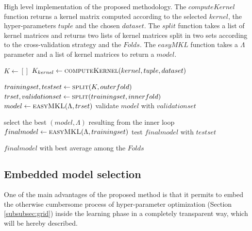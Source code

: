 \begin{algorithm}
    \caption{
        High level implementation of the proposed methodology.
        The $computeKernel$ function returns a kernel matrix computed
        according to the selected $kernel$, the hyper-parameters $tuple$ and 
        the chosen $dataset$.
        The $split$ function takes a list of kernel matrices and returns two lists
        of kernel matrices split in two sets according to the cross-validation
        strategy and the $Folds$.
        The $easyMKL$ function takes a $\Lambda$ parameter and a list of kernel
        matrices to return a $model$.
    }
    \label{alg:method}
    \begin{algorithmic}[1]
        \State $K \gets []$
        \label{line:kernels}
                \State $K_{kernel} \gets \Call{computeKernel}{kernel, tuple, dataset}$
            \EndFor
        \EndFor

            \State $trainingset, testset \gets \Call{split}{K, outerfold}$
            \label{line:osubsets}
                    \State $trset, validationset \gets \Call{split}{trainingset, innerfold}$
                    \label{line:isubsets}
                    \State $model \gets \Call{easyMKL}{\Lambda,trset}$
                    \State validate $model$ with $validationset$
                \EndFor
            \EndFor
            
            \State select the best $(model,\Lambda)$ resulting from the inner loop
            \State $finalmodel \gets \Call{easyMKL}{\Lambda,trainingset}$
            \State test $finalmodel$ with $testset$
        \EndFor

        \State \Return $finalmodel$ with best average among the $Folds$
    \end{algorithmic}
\end{algorithm}


\subsection{Embedded model selection}
\label{subsec:parameters}
One of the main advantages of the proposed method is that it permits to embed
the otherwise cumbersome process of hyper-parameter optimization (Section \ref{subsubsec:grid})
inside the learning phase in a completely transparent way, which will be hereby
described.

